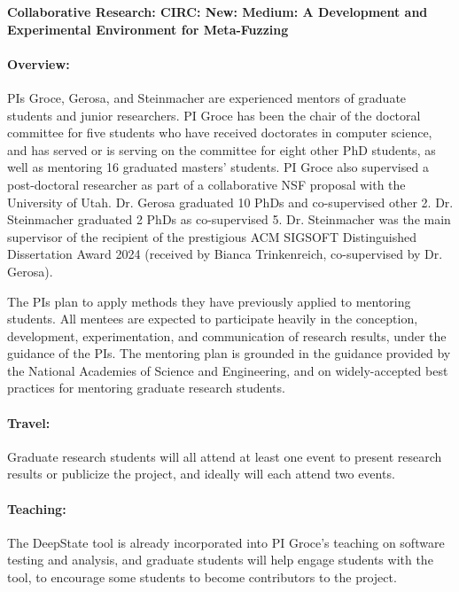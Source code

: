 \documentclass[12pt]{article}
\begin{document}

\begin{center}
{\Large\sf\textbf{Collaborative Research: CIRC: New: Medium: A Development and 
Experimental Environment for Meta-Fuzzing}}
\end{center}

\paragraph{Overview:} PIs Groce, Gerosa, and Steinmacher are experienced mentors of graduate students and junior researchers. PI Groce has been the chair of the doctoral committee for five students who have received doctorates in computer science, and has served or is serving on the committee for eight other PhD students, as well as mentoring 16 graduated masters' students. PI Groce also supervised a post-doctoral researcher as part of a collaborative NSF proposal with the University of Utah.  Dr. Gerosa graduated 10 PhDs and co-supervised other 2. Dr. Steinmacher graduated 2 PhDs as co-supervised 5. Dr. Steinmacher was the main supervisor of the recipient of the prestigious ACM SIGSOFT Distinguished Dissertation Award 2024 (received by Bianca Trinkenreich, co-supervised by Dr. Gerosa).


The PIs plan to apply methods they have previously applied to mentoring students. All mentees are expected to participate heavily in the conception, development, experimentation, and communication of research results, under the guidance of the PIs. The mentoring plan is grounded in the guidance provided by the National Academies of Science
and Engineering, and on widely-accepted best practices for mentoring graduate research students.

\paragraph{Travel:}  Graduate research students will all attend at least one event to present research results or publicize the project, and ideally will each attend two events.  

\paragraph{Teaching:}  The DeepState tool is already incorporated into PI Groce's teaching on software testing and analysis, and graduate students will help engage students with the tool, to encourage some students to become contributors to the project.
\end{document}
